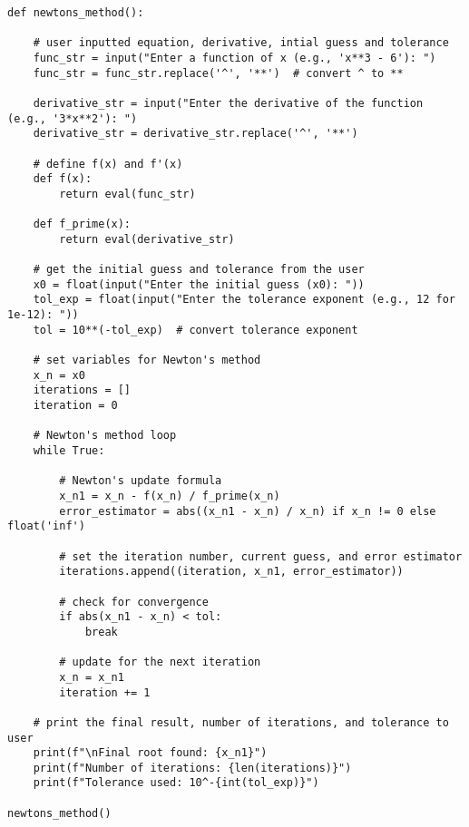 \documentclass[9pt]{extarticle}
\begin{document}
\begin{lstlisting}
def newtons_method():
    
    # user inputted equation, derivative, intial guess and tolerance 
    func_str = input("Enter a function of x (e.g., 'x**3 - 6'): ")
    func_str = func_str.replace('^', '**')  # convert ^ to ** 

    derivative_str = input("Enter the derivative of the function (e.g., '3*x**2'): ")
    derivative_str = derivative_str.replace('^', '**')

    # define f(x) and f'(x) 
    def f(x):
        return eval(func_str) 

    def f_prime(x):
        return eval(derivative_str)

    # get the initial guess and tolerance from the user
    x0 = float(input("Enter the initial guess (x0): "))
    tol_exp = float(input("Enter the tolerance exponent (e.g., 12 for 1e-12): "))
    tol = 10**(-tol_exp)  # convert tolerance exponent

    # set variables for Newton's method
    x_n = x0
    iterations = []
    iteration = 0

    # Newton's method loop
    while True:
        
        # Newton's update formula
        x_n1 = x_n - f(x_n) / f_prime(x_n)
        error_estimator = abs((x_n1 - x_n) / x_n) if x_n != 0 else float('inf')

        # set the iteration number, current guess, and error estimator
        iterations.append((iteration, x_n1, error_estimator))

        # check for convergence
        if abs(x_n1 - x_n) < tol:
            break

        # update for the next iteration
        x_n = x_n1
        iteration += 1

    # print the final result, number of iterations, and tolerance to user
    print(f"\nFinal root found: {x_n1}")
    print(f"Number of iterations: {len(iterations)}")
    print(f"Tolerance used: 10^-{int(tol_exp)}")

newtons_method()
\end{lstlisting}
\end{document}
